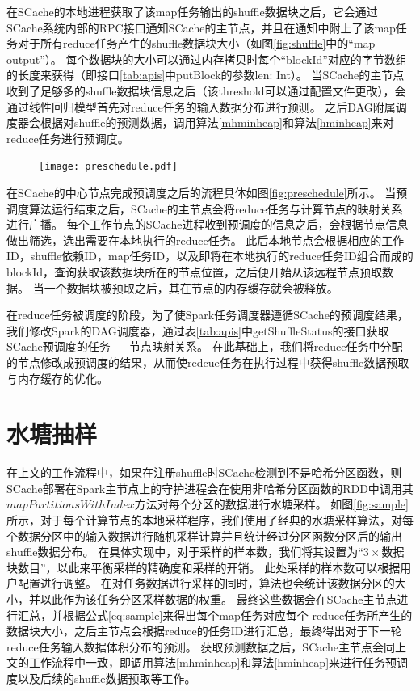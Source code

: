 在SCache的本地进程获取了该map任务输出的shuffle数据块之后，它会通过SCache系统内部的RPC接口通知SCache的主节点，并且在通知中附上了该map任务对于所有reduce任务产生的shuffle数据块大小（如图\ref{fig:shuffle}中的“map output”）。
每个数据块的大小可以通过内存拷贝时每个“blockId”对应的字节数组的长度来获得（即接口\ref{tab:apis}中putBlock的参数len: Int）。
当SCache的主节点收到了足够多的shuffle数据块信息之后（该threshold可以通过配置文件更改），会通过线性回归模型首先对reduce任务的输入数据分布进行预测。
之后DAG附属调度器会根据对shuffle的预测数据，调用算法\ref{mhminheap}和算法\ref{hminheap}来对reduce任务进行预调度。

\begin{figure}[!htp]
	\centering
	\texttt{[image: preschedule.pdf]}
\end{figure}

在SCache的中心节点完成预调度之后的流程具体如图\ref{fig:preschedule}所示。
当预调度算法运行结束之后，SCache的主节点会将reduce任务与计算节点的映射关系进行广播。
每个工作节点的SCache进程收到预调度的信息之后，会根据节点信息做出筛选，选出需要在本地执行的reduce任务。
此后本地节点会根据相应的工作ID，shuffle依赖ID，map任务ID，以及即将在本地执行的reduce任务ID组合而成的blockId，查询获取该数据块所在的节点位置，之后便开始从该远程节点预取数据。
当一个数据块被预取之后，其在节点的内存缓存就会被释放。

在reduce任务被调度的阶段，为了使Spark任务调度器遵循SCache的预调度结果，我们修改Spark的DAG调度器，通过表\ref{tab:apis}中getShuffleStatus的接口获取SCache预调度的任务 --- 节点映射关系。
在此基础上，我们将reduce任务中分配的节点修改成预调度的结果，从而使redcue任务在执行过程中获得shuffle数据预取与内存缓存的优化。

\section{水塘抽样}
\label{sec:sampling}

在上文的工作流程中，如果在注册shuffle时SCache检测到不是哈希分区函数，则SCache部署在Spark主节点上的守护进程会在使用非哈希分区函数的RDD中调用其$mapPartitionsWithIndex$\cite{sparksource}方法对每个分区的数据进行水塘采样。
如图\ref{fig:sample}所示，对于每个计算节点的本地采样程序，我们使用了经典的水塘采样算法\cite{reservoir}，对每个数据分区中的输入数据进行随机采样计算并且统计经过分区函数分区后的输出shuffle数据分布。
在具体实现中，对于采样的样本数，我们将其设置为“$3 \times $数据块数目”，以此来平衡采样的精确度和采样的开销。
此处采样的样本数可以根据用户配置进行调整。
在对任务数据进行采样的同时，算法也会统计该数据分区的大小，并以此作为该任务分区采样数据的权重。
最终这些数据会在SCache主节点进行汇总，并根据公式\ref{eq:sample}来得出每个map任务对应每个
reduce任务所产生的数据块大小，之后主节点会根据reduce的任务ID进行汇总，最终得出对于下一轮reduce任务输入数据体积分布的预测。
获取预测数据之后，SCache主节点会同上文的工作流程中一致，即调用算法\ref{mhminheap}和算法\ref{hminheap}来进行任务预调度以及后续的shuffle数据预取等工作。

